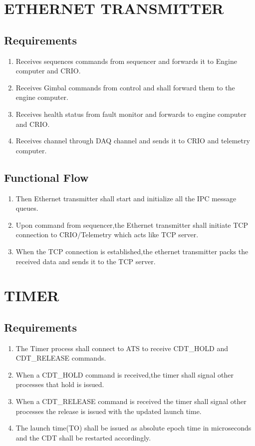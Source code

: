 \newpage

\section{ETHERNET TRANSMITTER}
\subsection{Requirements}

\begin{enumerate}
	\item Receives sequences commands from sequencer and forwards it to Engine computer and CRIO.
	\item Receives Gimbal commands from control and shall forward them to the engine computer.
	\item Receives health status from fault monitor and forwards to engine computer and CRIO.
	\item Receives channel through DAQ channel and sends it to CRIO and telemetry computer.
\end{enumerate}

\subsection{Functional Flow}

\begin{enumerate}
	\item Then Ethernet transmitter shall start and initialize all the IPC message queues.
	\item Upon command from sequencer,the Ethernet transmitter shall initiate TCP connection to CRIO/Telemetry which acts like TCP server.
	\item When the TCP connection is established,the ethernet transmitter packs the received data and sends it to the TCP server.
	
\end{enumerate}



\newpage

\section{TIMER}
\subsection{Requirements}

\begin{enumerate}
  \item The Timer process shall connect to ATS to receive CDT\_HOLD and CDT\_RELEASE commands.
  \item When a CDT\_HOLD command is received,the timer shall signal other processes that hold is issued.
  \item When a CDT\_RELEASE command is received the timer shall signal other processes the release is issued with the updated launch time.
  \item The launch time(TO) shall be issued as absolute epoch time in microseconds and the CDT shall be restarted accordingly.
\end{enumerate}

